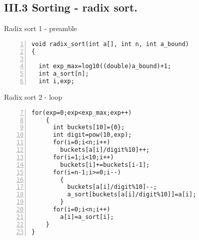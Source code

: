 \documentclass{beamer}
\begin{document}
\subsection*{III.3 Sorting - radix sort.}
\begin{frame}[fragile]{Radix sort 1 - preamble}
\begin{lstlisting}[numbers=left]
void radix_sort(int a[], int n, int a_bound)
{

  int exp_max=log10((double)a_bound)+1;
  int a_sort[n];
  int i,exp;
\end{lstlisting}
\end{frame}
\begin{frame}[fragile]{Radix sort 2 - loop}
\begin{lstlisting}[numbers=left,firstnumber=7]
  for(exp=0;exp<exp_max;exp++)
    {
      int buckets[10]={0};
      int digit=pow(10,exp);
      for(i=0;i<n;i++)
        buckets[a[i]/digit%10]++;
      for(i=1;i<10;i++)
        buckets[i]+=buckets[i-1];
      for(i=n-1;i>=0;i--)
        {
          buckets[a[i]/digit%10]--;
          a_sort[buckets[a[i]/digit%10]]=a[i];
        }
      for(i=0;i<n;i++)
        a[i]=a_sort[i];
    }
}
\end{lstlisting}
\end{frame}
\end{document}
